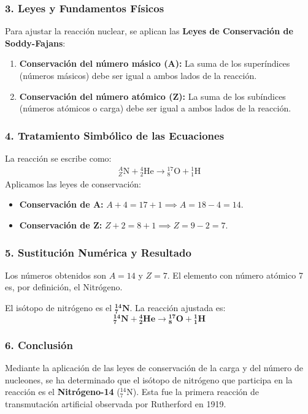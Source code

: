 \subsubsection*{3. Leyes y Fundamentos Físicos}
Para ajustar la reacción nuclear, se aplican las \textbf{Leyes de Conservación de Soddy-Fajans}:
\begin{enumerate}
    \item \textbf{Conservación del número másico (A):} La suma de los superíndices (números másicos) debe ser igual a ambos lados de la reacción.
    \item \textbf{Conservación del número atómico (Z):} La suma de los subíndices (números atómicos o carga) debe ser igual a ambos lados de la reacción.
\end{enumerate}

\subsubsection*{4. Tratamiento Simbólico de las Ecuaciones}
La reacción se escribe como:
\begin{gather}
    {}_{Z}^{A}\text{N} + {}_{2}^{4}\text{He} \rightarrow {}_{8}^{17}\text{O} + {}_{1}^{1}\text{H}
\end{gather}
Aplicamos las leyes de conservación:
\begin{itemize}
    \item \textbf{Conservación de A:} $A + 4 = 17 + 1 \implies A = 18 - 4 = 14$.
    \item \textbf{Conservación de Z:} $Z + 2 = 8 + 1 \implies Z = 9 - 2 = 7$.
\end{itemize}

\subsubsection*{5. Sustitución Numérica y Resultado}
Los números obtenidos son $A=14$ y $Z=7$. El elemento con número atómico 7 es, por definición, el Nitrógeno.
\begin{cajaresultado}
    El isótopo de nitrógeno es el $\boldsymbol{{}_{7}^{14}\textbf{N}}$. La reacción ajustada es:
    $$ \boldsymbol{{}_{7}^{14}\textbf{N} + {}_{2}^{4}\textbf{He} \rightarrow {}_{8}^{17}\textbf{O} + {}_{1}^{1}\textbf{H}} $$
\end{cajaresultado}

\subsubsection*{6. Conclusión}
\begin{cajaconclusion}
    Mediante la aplicación de las leyes de conservación de la carga y del número de nucleones, se ha determinado que el isótopo de nitrógeno que participa en la reacción es el \textbf{Nitrógeno-14} (${}_{7}^{14}\text{N}$). Esta fue la primera reacción de transmutación artificial observada por Rutherford en 1919.
\end{cajaconclusion}

